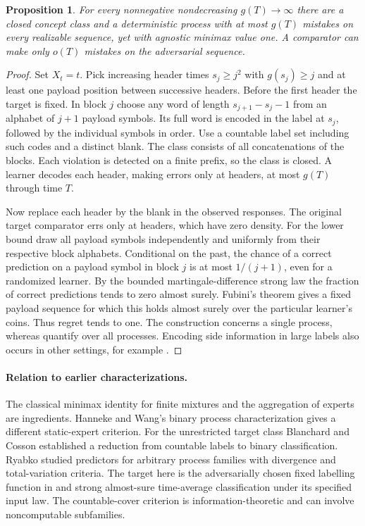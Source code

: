 \documentclass[11pt]{article}
\newtheorem{proposition}[theorem]{Proposition}
\begin{document}
\begin{proposition}\label{sep}
For every nonnegative nondecreasing $g(T)\to\infty$ there are a closed concept class and a deterministic process with at most $g(T)$ mistakes on every realizable sequence, yet with agnostic minimax value one. A comparator can make only $o(T)$ mistakes on the adversarial sequence.
\end{proposition}
\begin{proof}
Set $X_t=t$. Pick increasing header times $s_j\ge j^2$ with $g(s_j)\ge j$ and at least one payload position between successive headers. Before the first header the target is fixed. In block $j$ choose any word of length $s_{j+1}-s_j-1$ from an alphabet of $j+1$ payload symbols. Its full word is encoded in the label at $s_j$, followed by the individual symbols in order. Use a countable label set including such codes and a distinct blank. The class consists of all concatenations of the blocks. Each violation is detected on a finite prefix, so the class is closed. A learner decodes each header, making errors only at headers, at most $g(T)$ through time $T$.

Now replace each header by the blank in the observed responses. The original target comparator errs only at headers, which have zero density. For the lower bound draw all payload symbols independently and uniformly from their respective block alphabets. Conditional on the past, the chance of a correct prediction on a payload symbol in block $j$ is at most $1/(j+1)$, even for a randomized learner. By the bounded martingale-difference strong law the fraction of correct predictions tends to zero almost surely. Fubini's theorem gives a fixed payload sequence for which this holds almost surely over the particular learner's coins. Thus regret tends to one. The construction concerns a single process, whereas \cite[Theorems D.6, D.9]{hw} quantify over all processes. Encoding side information in large labels also occurs in other settings, for example \cite{hk}.
\end{proof}

\paragraph{Relation to earlier characterizations.}
The classical minimax identity for finite mixtures and the aggregation of experts are ingredients. Hanneke and Wang's binary process characterization \cite{binary} gives a different static-expert criterion. For the unrestricted target class Blanchard and Cosson \cite{bc} established a reduction from countable labels to binary classification. Ryabko \cite{ryabko} studied predictors for arbitrary process families with divergence and total-variation criteria. The target here is the adversarially chosen fixed labelling function in \cite[Open Question 1]{hw} and strong almost-sure time-average classification under its specified input law. The countable-cover criterion is information-theoretic and can involve noncomputable subfamilies.
\end{document}

